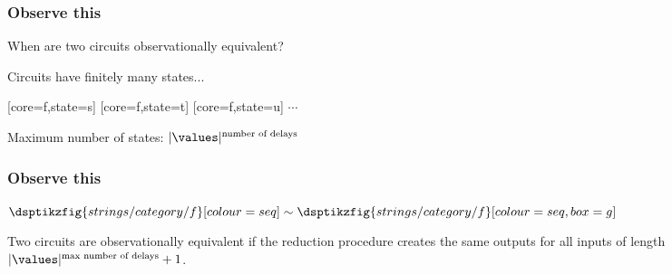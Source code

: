 \begin{frame}
    \frametitle{Observe this}

    \centering
    \LARGE

    When are two circuits \alert{observationally equivalent}?

    \await

    Circuits have \alert{finitely many states}...

    \vspace{1em}

    [core=f,state=s]
    \quad
    [core=f,state=t]
    \quad
    [core=f,state=u]
    \quad
    \(\cdots\)

    \vspace{1em}

    Maximum number of states: \(|\values|^{\text{number of delays}}\)

\end{frame}
\begin{frame}
    \frametitle{Observe this}

    \centering
    \Large

    \(
    \dsptikzfig{strings/category/f}[colour=seq]
    \sim
    \dsptikzfig{strings/category/f}[colour=seq,box=g]
    \)

    \qquad

    Two circuits are \alert{observationally equivalent} if the
    reduction procedure creates the same outputs for all inputs of length
    \(|\values|^{\text{max number of delays}} + 1\).

\end{frame}

